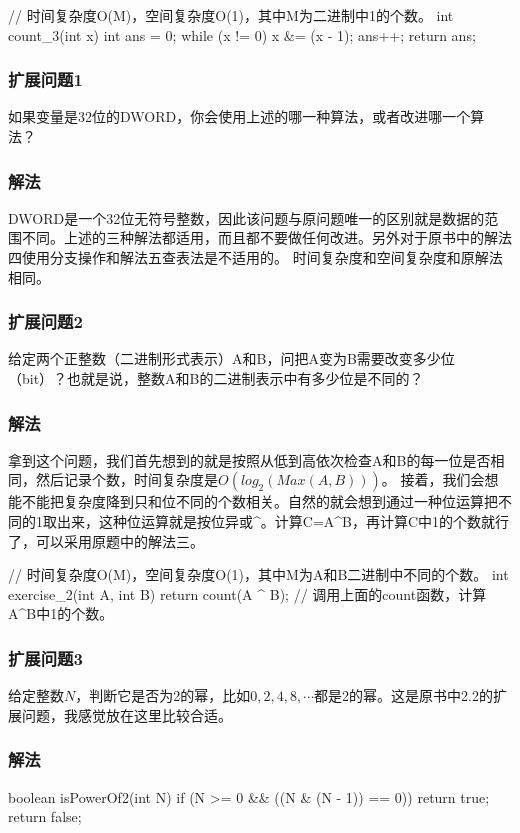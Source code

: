 \begin{Code}
// 时间复杂度O(M)，空间复杂度O(1)，其中M为二进制中1的个数。
int count_3(int x) {
    int ans = 0;
    while (x != 0) {
        x &= (x - 1);
        ans++;
    }
    return ans;
}
\end{Code}

\subsubsection{扩展问题1}
如果变量是32位的DWORD，你会使用上述的哪一种算法，或者改进哪一个算法？

\subsubsection{解法}
DWORD是一个32位无符号整数，因此该问题与原问题唯一的区别就是数据的范围不同。上述的三种解法都适用，而且都不要做任何改进。另外对于原书中的解法四使用分支操作和解法五查表法是不适用的。
时间复杂度和空间复杂度和原解法相同。

\subsubsection{扩展问题2}
给定两个正整数（二进制形式表示）A和B，问把A变为B需要改变多少位（bit）？也就是说，整数A和B的二进制表示中有多少位是不同的？

\subsubsection{解法}
拿到这个问题，我们首先想到的就是按照从低到高依次检查A和B的每一位是否相同，然后记录个数，时间复杂度是$O(log_2(Max(A,B)))$。
接着，我们会想能不能把复杂度降到只和位不同的个数相关。自然的就会想到通过一种位运算把不同的1取出来，这种位运算就是按位异或\^{}。计算C=A\^{}B，再计算C中1的个数就行了，可以采用原题中的解法三。


\begin{Code}
// 时间复杂度O(M)，空间复杂度O(1)，其中M为A和B二进制中不同的个数。
int exercise_2(int A, int B) {
    return count(A ^ B);	// 调用上面的count函数，计算A^B中1的个数。
}
\end{Code}

\subsubsection{扩展问题3}
给定整数$N$，判断它是否为2的幂，比如$0,2,4,8,\cdots$都是2的幂。这是原书中2.2的扩展问题，我感觉放在这里比较合适。

\subsubsection{解法}
\begin{Code}
boolean isPowerOf2(int N) {
    if (N >= 0 && ((N & (N - 1)) == 0)) return true;
    return false;
}
\end{Code}

